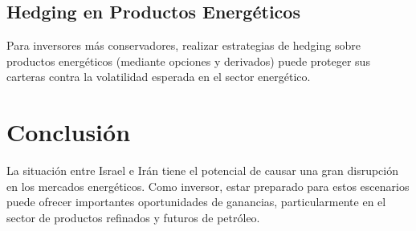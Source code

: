 \documentclass{article}
\begin{document}
\subsection{Hedging en Productos Energéticos}
Para inversores más conservadores, realizar estrategias de hedging sobre productos energéticos (mediante opciones y derivados) puede proteger sus carteras contra la volatilidad esperada en el sector energético.

\section{Conclusión}
La situación entre Israel e Irán tiene el potencial de causar una gran disrupción en los mercados energéticos. Como inversor, estar preparado para estos escenarios puede ofrecer importantes oportunidades de ganancias, particularmente en el sector de productos refinados y futuros de petróleo.
\end{document}
